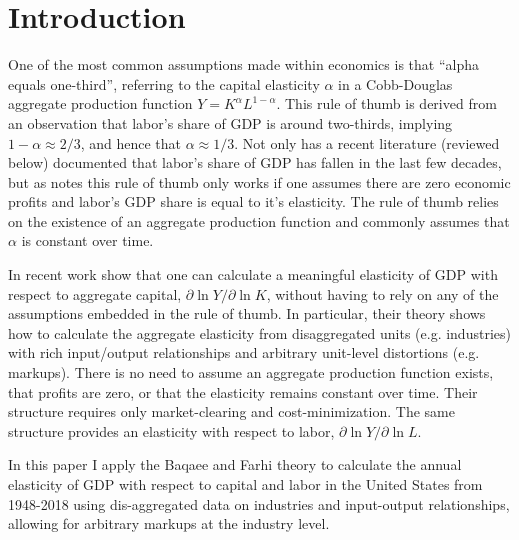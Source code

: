 \documentclass[11pt]{article}
\begin{document}
\section{Introduction}
\onehalfspacing One of the most common assumptions made within economics is that ``alpha equals one-third'', referring to the capital elasticity $\alpha$ in a Cobb-Douglas aggregate production function $Y = K^{\alpha}L^{1-\alpha}$. This rule of thumb is derived from an observation that labor's share of GDP is around two-thirds, implying $1-\alpha \approx 2/3$, and hence that $\alpha \approx 1/3$. Not only has a recent literature (reviewed below) documented that labor's share of GDP has fallen in the last few decades, but as \cite{hall1988,hall1990} notes this rule of thumb only works if one assumes there are zero economic profits and labor's GDP share is equal to it's elasticity. The rule of thumb relies on the existence of an aggregate production function and commonly assumes that $\alpha$ is constant over time.

In recent work \cite{bfshortnote,bfprodge} show that one can calculate a meaningful elasticity of GDP with respect to aggregate capital, $\partial \ln Y/ \partial \ln K$, without having to rely on any of the assumptions embedded in the rule of thumb. In particular, their theory shows how to calculate the aggregate elasticity from disaggregated units (e.g. industries) with rich input/output relationships and arbitrary unit-level distortions (e.g. markups). There is no need to assume an aggregate production function exists, that profits are zero, or that the elasticity remains constant over time. Their structure requires only market-clearing and cost-minimization. The same structure provides an elasticity with respect to labor, $\partial \ln Y/ \partial \ln L$.

In this paper I apply the Baqaee and Farhi theory to calculate the annual elasticity of GDP with respect to capital and labor in the United States from 1948-2018 using dis-aggregated data on industries and input-output relationships, allowing for arbitrary markups at the industry level.
\end{document}
